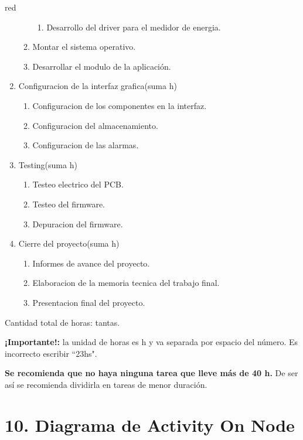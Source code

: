 \documentclass[
11pt, %
codirector, %
]{charter}
\begin{document}
\begin{consigna}{red}
\begin{enumerate}
\begin{enumerate}
\begin{enumerate}
		\item Desarrollo del driver para el medidor de energia.
	\end{enumerate}
	\item Montar el sistema operativo.
	\item Desarrollar el modulo de la aplicación.
	\end{enumerate}
\item Configuracion de la interfaz grafica(suma h)	
    \begin{enumerate}
		\item Configuracion de los componentes en la interfaz.
		\item Configuracion del almacenamiento.
		\item Configuracion de las alarmas.
	\end{enumerate}
\item Testing(suma h)	
    \begin{enumerate}
		\item Testeo electrico del PCB.
		\item Testeo del firmware.
		\item Depuracion del firmware.
	\end{enumerate}
\item Cierre del proyecto(suma h)	
    \begin{enumerate}
		\item Informes de avance del proyecto.
		\item Elaboracion de la memoria tecnica del trabajo final.
		\item Presentacion final del proyecto.
	\end{enumerate}


\end{enumerate}

Cantidad total de horas: tantas.

\textbf{¡Importante!:} la unidad de horas es h y va separada por espacio del número. Es incorrecto escribir ``23hs".

\textbf{Se recomienda que no haya ninguna tarea que lleve más de 40 h.} De ser así se recomienda dividirla en tareas de menor duración.

\end{consigna}

\section{10. Diagrama de Activity On Node}
\label{sec:AoN}
\end{document}
